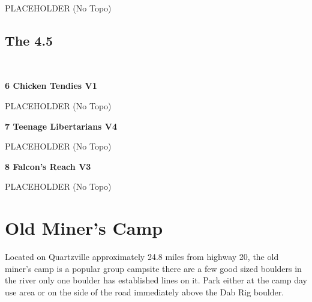 \begin{multicols}{2}
\begin{minipage}{\linewidth}
					\begin{adjustwidth}{0.5cm}{}				
					PLACEHOLDER
						\newline (No Topo) 
					\end{adjustwidth}
					\end{minipage}
			\subsection*{The 4.5}\label{bf:The 4.5}
			\begin{minipage}{\columnwidth}
			\
			\end{minipage}
			
					\begin{minipage}{\linewidth}	
					\label{rt:Chicken Tendies}
\colorbox{green!20}{
\parbox{0.95\textwidth}{
\textbf{
6 Chicken Tendies V1 \ding{72}  
}
}
}

					\begin{adjustwidth}{0.5cm}{}				
					PLACEHOLDER
						\newline (No Topo) 
					\end{adjustwidth}
					\end{minipage}
					\begin{minipage}{\linewidth}	
					\label{rt:Teenage Libertarians}
\colorbox{RoyalBlue!20}{
\parbox{0.95\textwidth}{
\textbf{
7 Teenage Libertarians V4  \ding{72} \ding{72}  
}
}
}

					\begin{adjustwidth}{0.5cm}{}				
					PLACEHOLDER
						\newline (No Topo) 
					\end{adjustwidth}
					\end{minipage}
					\begin{minipage}{\linewidth}	
					\label{rt:Falcon's Reach}
\colorbox{green!20}{
\parbox{0.95\textwidth}{
\textbf{
8 Falcon's Reach V3 \ding{72}  
}
}
}

					\begin{adjustwidth}{0.5cm}{}				
					PLACEHOLDER
						\newline (No Topo) 
					\end{adjustwidth}
					\end{minipage}
\newpage
		\section{Old Miner's Camp}\label{sa:Old Miner's Camp}
	\begin{minipage}{\columnwidth}
	Located on Quartzville approximately 24.8 miles from highway 20, the old miner's camp is a popular group campsite there are a few good sized boulders in the river only one boulder has established lines on it. Park either at the camp day use area or on the side of the road immediately above the Dab Rig boulder.
	\end{minipage}

\end{multicols}
